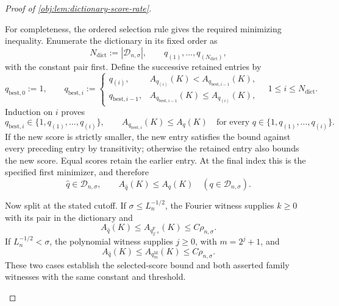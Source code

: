 \begin{proof}[Proof of \cref{obj:lem:dictionary-score-rate}]
\begin{enumerate}
For completeness, the ordered selection rule gives the required minimizing inequality. Enumerate the dictionary in its fixed order as
\[
N_{\mathrm{dict}}:=|\mathcal D_{n,\sigma}|,
\qquad
q_{(1)},\ldots,q_{(N_{\mathrm{dict}})},
\]
with the constant pair first. Define the successive retained entries by
\[
q_{\mathrm{best},0}:=1,
\qquad
q_{\mathrm{best},i}:=
\begin{cases}
q_{(i)},&A_{q_{(i)}}(K)<A_{q_{\mathrm{best},i-1}}(K),\\
q_{\mathrm{best},i-1},&A_{q_{\mathrm{best},i-1}}(K)\le A_{q_{(i)}}(K),
\end{cases}
\quad 1\le i\le N_{\mathrm{dict}}.
\]
Induction on \(i\) proves
\[
q_{\mathrm{best},i}\in\{1,q_{(1)},\ldots,q_{(i)}\},
\qquad
A_{q_{\mathrm{best},i}}(K)\le A_q(K)
\quad
\text{for every }q\in\{1,q_{(1)},\ldots,q_{(i)}\}.
\]
If the new score is strictly smaller, the new entry satisfies the bound against every preceding entry by transitivity; otherwise the retained entry also bounds the new score. Equal scores retain the earlier entry. At the final index this is the specified first minimizer, and therefore
\[
\widehat q\in\mathcal D_{n,\sigma},
\qquad
A_{\widehat q}(K)\le A_q(K)
\quad(q\in\mathcal D_{n,\sigma}).
\]

Now split at the stated cutoff. If \(\sigma\le L_n^{-1/2}\), the Fourier witness supplies \(k\ge0\) with its pair in the dictionary and
\[
A_{\widehat q}(K)\le A_{q_{2^{-k}}^{\mathrm F}}(K)
\le C\rho_{n,\sigma}.
\]
If \(L_n^{-1/2}<\sigma\), the polynomial witness supplies \(j\ge0\), with \(m=2^j+1\), and
\[
A_{\widehat q}(K)\le A_{q_m^{\mathrm M}}(K)
\le C\rho_{n,\sigma}.
\]
These two cases establish the selected-score bound and both asserted family witnesses with the same constant and threshold.
\end{enumerate}
\end{proof}

